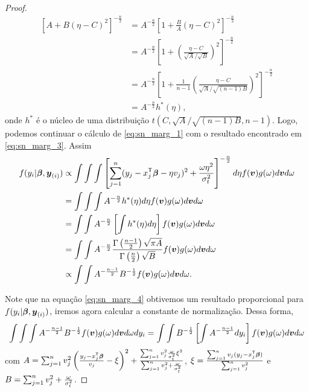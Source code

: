 \begin{proof}
\begin{equation}\label{eq:sn_marg_3}
\begin{split}
\left[A + B(\eta - C)^2\right]^{-\frac{n}{2}} & = A^{-\frac{n}{2}}\left[1 + \frac{B}{A}(\eta - C)^2\right]^{-\frac{n}{2}} \\
{} & = A^{-\frac{n}{2}}\left[1 + \left(\frac{\eta - C}{\sqrt{A}/\sqrt{B}}\right)^2\right]^{-\frac{n}{2}} \\
{} & = A^{-\frac{n}{2}}\left[1 + \frac{1}{n-1}\left(\frac{\eta - C}{\sqrt{A}/\sqrt{(n-1)B}}\right)^2\right]^{-\frac{n}{2}} \\
{} & = A^{-\frac{n}{2}}h^*(\eta),
\end{split}
\end{equation}
onde $h^*$ é o núcleo de uma distribuição $t(C,\sqrt{A}/\sqrt{(n-1)B},n-1)$. Logo, podemos continuar o cálculo de \eqref{eq:sn_marg_1} com o resultado encontrado em \eqref{eq:sn_marg_3}. Assim
\begin{equation}\label{eq:sn_marg_4}
\begin{split}
f(y_i|{\boldsymbol{\beta}},{\boldsymbol{y}_{(i)}})  & \propto  \int\int\int\left[\sum_{j=1}^n(y_j-x_j^{\mathsf{T}}{\boldsymbol{\beta}} - \eta v_j)^2+\frac{\omega\eta^2}{\sigma^2_t}\right]^{-\frac{n}{2}} d\eta f({\boldsymbol{v}})g(\omega)d{\boldsymbol{v}} d\omega \\
{} & = \int\int\int A^{-\frac{n}{2}}h^*(\eta) d\eta f({\boldsymbol{v}})g(\omega)d{\boldsymbol{v}} d\omega \\
{} & = \int\int A^{-\frac{n}{2}}\left[\int h^*(\eta) d\eta\right] f({\boldsymbol{v}})g(\omega)d{\boldsymbol{v}} d\omega\\
{} & = \int\int A^{-\frac{n}{2}}\frac{\Gamma\left(\frac{n-1}{2}\right)\sqrt{\pi A}}{\Gamma\left(\frac{n}{2}\right)\sqrt{B}} f({\boldsymbol{v}})g(\omega)d{\boldsymbol{v}} d\omega \\
{} & \propto \int\int A^{-\frac{n-1}{2}}B^{-\frac{1}{2}}f({\boldsymbol{v}})g(\omega)d{\boldsymbol{v}} d\omega.
\end{split}
\end{equation}

Note que na equação \eqref{eq:sn_marg_4} obtivemos um resultado proporcional para $f(y_i|{\boldsymbol{\beta}},{\boldsymbol{y}_{(i)}})$, iremos agora calcular a constante de normalização. Dessa forma,
\begin{equation}\label{eq:sn_marg_5}
\int \int\int A^{-\frac{n-1}{2}}B^{-\frac{1}{2}}f({\boldsymbol{v}})g(\omega)d{\boldsymbol{v}} d\omega d y_i  =  \int\int B^{-\frac{1}{2}}\left[ \int A^{-\frac{n-1}{2}}d y_i \right]f({\boldsymbol{v}})g(\omega)d{\boldsymbol{v}} d\omega 
\end{equation}
com $A=\sum_{j=1}^nv_j^2\left(\frac{y_j-x_j^{\mathsf{T}}{\boldsymbol{\beta}}}{v_j} - \xi\right)^2 + \frac{\sum_{j=1}^nv_j^2\frac{\omega}{\sigma^2_t}\xi^2}{\sum_{j=1}^nv_j^2+\frac{\omega}{\sigma^2_t}}$, $\xi = \frac{\sum_{j=1}^nv_j(y_j-x_j^{\mathsf{T}}{\boldsymbol{\beta}})}{\sum_{j=1}^nv_j^2}$ e $ B = \sum_{j=1}^nv_j^2+\frac{\omega}{\sigma^2_t}$.


\end{proof}
